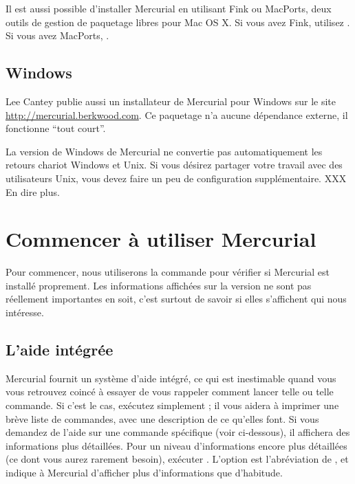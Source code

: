 Il est aussi possible d'installer Mercurial en utilisant Fink ou MacPorts,
deux outils de gestion de paquetage libres pour Mac OS X. Si vous avez 
Fink, utilisez . Si vous avez 
MacPorts, .

\subsection{Windows}

Lee Cantey publie aussi un installateur de Mercurial pour Windows sur le site
\url{http://mercurial.berkwood.com}. Ce paquetage n'a aucune dépendance 
externe, il fonctionne ``tout court''.

\begin{note}
  La version de Windows de Mercurial ne convertie pas automatiquement
  les retours chariot Windows et Unix. Si vous désirez partager votre
  travail avec des utilisateurs Unix, vous devez faire un peu de configuration
  supplémentaire. XXX En dire plus.
\end{note}

\section{Commencer à utiliser Mercurial}

Pour commencer, nous utiliserons la commande  pour vérifier
si Mercurial est installé proprement. Les informations affichées sur la 
version ne sont pas réellement importantes en soit, c'est surtout de savoir
si elles s'affichent qui nous intéresse.

\subsection{L'aide intégrée}

Mercurial fournit un système d'aide intégré, ce qui est inestimable quand
vous vous retrouvez coincé à essayer de vous rappeler comment lancer telle
ou telle commande. 
Si c'est le cas, exécutez simplement ; il vous aidera à imprimer
une brève liste de commandes, avec une description de ce qu'elles font. Si vous
demandez de l'aide sur une commande spécifique (voir ci-dessous), il affichera
des informations plus détaillées.
Pour un niveau d'informations encore plus détaillées (ce dont vous aurez rarement
besoin), exécuter .  L'option  est 
l'abréviation de , et indique à Mercurial d'afficher plus 
d'informations que d'habitude.


